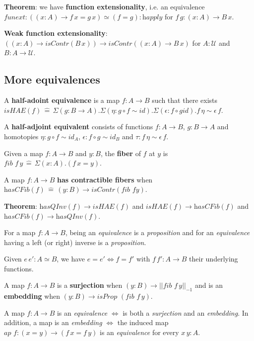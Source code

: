 \documentclass[a4paper]{article}
\begin{document}
\textbf{Theorem}: we have \textbf{function extensionality}, i.e. an equivalence $\textit{funext} : ((x : A) \to f \, x = g \, x) \simeq (f = g) : \textit{happly}$ for $f \, g : (x : A) \to B \, x$.

\textbf{Weak function extensionality}: $((x : A) \to \textit{isContr}(B \, x)) \to \textit{isContr}((x : A) \to B \, x)$ for $A : \mathcal{U}$ and $B : A \to \mathcal{U}$.

\subsection*{More equivalences}

A \textbf{half-adoint equivalence} is a map $f : A \to B$ such that there exists $\textit{isHAE}(f) \, \hat{=} \, \Sigma(g : B \to A).\Sigma(\eta : g \circ f \sim \textit{id}).\Sigma(\epsilon : f \circ g \textit{id}). f \, \eta \sim \epsilon \, f$.

A \textbf{half-adjoint equivalent} consists of functions $f : A \to B$, $g : B \to A$ and homotopies $\eta : g \circ f \sim \textit{id}_A$, $\epsilon : f \circ g \sim \textit{id}_B$ and $\tau : f \, \eta \sim \epsilon \, f$.

Given a map $f : A \to B$ and $y : B$, the \textbf{fiber} of $f$ at $y$ is $\textit{fib } f \, y \, \hat{=} \, \Sigma(x : A).(f \, x = y)$.

A map $f : A \to B$ \textbf{has contractible fibers} when $\textit{hasCFib}(f) \, \hat{=} \, (y : B) \to \textit{isContr}(\textit{fib } f y)$.

\textbf{Theorem}: $\textit{hasQInv}(f) \to \textit{isHAE}(f)$ and $\textit{isHAE}(f) \to \textit{hasCFib}(f)$ and $\textit{hasCFib}(f) \to \textit{hasQInv}(f)$.

For a map $f : A \to B$, being an \textit{equivalence} is a \textit{proposition} and for an \textit{equivalence} having a left (or right) inverse is a \textit{proposition}.

Given $e \, e' : A \simeq B$, we have $e = e' \iff f = f'$ with $f \, f' : A \to B$ their underlying functions.

A map $f : A \to B$ is a \textbf{surjection} when $(y : B) \to || \textit{fib } f \, y ||_{-1}$ and is an \textbf{embedding} when $(y : B) \to \textit{isProp }(\textit{fib } f \, y)$.

A map $f : A \to B$ is an \textit{equivalence} $\iff$ is both a \textit{surjection} and an \textit{embedding}. In addition, a map is an \textit{embedding} $\iff$ the induced map $\textit{ap } f : (x = y) \to (f \, x = f \, y)$ is an \textit{equivalence} for every $x \, y : A$.
\end{document}

